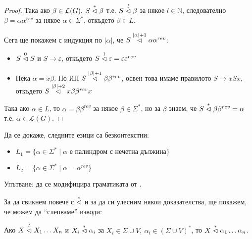 \begin{proof}
    Така ако $\beta \in \mathcal{L}(G), \: S \stackrel{*}{\vartriangleleft} \beta$ т.е. $S \stackrel{l}{\vartriangleleft} \beta$ за някое $l \in \mathbb{N}$,
    следователно $\beta = \alpha \alpha^{rev}$ за някое $\alpha \in \Sigma^*$, откъдето $\beta \in L$.

    Сега ще покажем с индукция по $|\alpha|$, че $S \stackrel{|\alpha| + 1}{\vartriangleleft} \alpha \alpha^{rev}$:
    \begin{itemize}
        \item $S \stackrel{0}{\vartriangleleft} S$ и $S \rightarrow \varepsilon$, откъдето $S \stackrel{1}{\vartriangleleft} \varepsilon = \varepsilon \varepsilon^{rev}$ \checkmark
        \item Нека $\alpha = x \beta$. По ИП $S \stackrel{|\beta| + 1}{\vartriangleleft} \beta \beta^{rev}$, освен това имаме правилото $S \rightarrow xSx$, откъдето $S \stackrel{|\beta| + 2}{\vartriangleleft} x \beta \beta^{rev} x$
    \end{itemize}

    Така ако $\alpha \in L$, то $\alpha = \beta \beta^{rev}$ за някое $\beta \in \Sigma^*$, но за $\beta$ знаем, че $S \stackrel{*}{\vartriangleleft} \beta \beta^{rev} = \alpha$ т.е. $\alpha \in \mathcal{L}(G)$.
\end{proof}

\begin{problem}
Да се докаже, следните езици са безконтекстни:
\begin{itemize}
    \item $L_1 = \{ \alpha \in \Sigma^* \mid \alpha \text{ е палиндром с нечетна дължина} \}$
    \item $L_2 = \{ \alpha \in \Sigma^* \mid \alpha = \alpha^{rev} \}$
\end{itemize}
Упътване: да се модифицира граматиката от .
\end{problem}

За да свикнем повече с $\stackrel{*}{\vartriangleleft}$ и за да си улесним някои доказателства, ще покажем, че можем да ``слепваме'' изводи:

\begin{claim}
    Ако $X \stackrel{l}{\vartriangleleft} X_1 \dots X_n$ и $X_i \stackrel{*}{\vartriangleleft} \alpha_i$ за $X_i \in \Sigma \cup V, \: \alpha_i \in (\Sigma \cup V)^*$,
    то $X \stackrel{*}{\vartriangleleft} \alpha_1 \dots \alpha_n$.
\end{claim}

